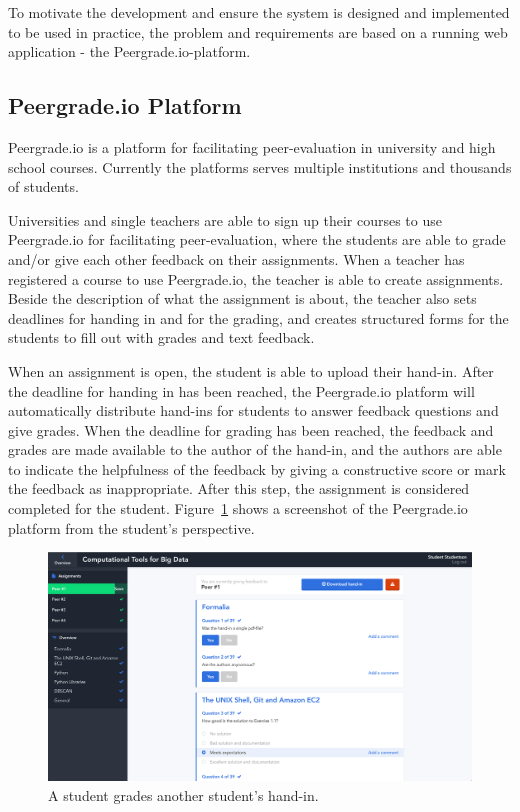 To motivate the development and ensure the system is designed and implemented to be used in practice, the problem and requirements are based on a running web application - the Peergrade.io-platform.

\subsection{Peergrade.io Platform}
\label{subsec:the-peergrade-io-platform}

Peergrade.io is a platform for facilitating peer-evaluation in university and high school courses. Currently the platforms serves multiple institutions and thousands of students.

Universities and single teachers are able to sign up their courses to use Peergrade.io for facilitating peer-evaluation, where the students are able to grade and/or give each other feedback on their assignments. When a teacher has registered a course to use Peergrade.io, the teacher is able to create assignments. Beside the description of what the assignment is about, the teacher also sets deadlines for handing in and for the grading, and creates structured forms for the students to fill out with grades and text feedback.

When an assignment is open, the student is able to upload their hand-in. After the deadline for handing in has been reached, the Peergrade.io platform will automatically distribute hand-ins for students to answer feedback questions and give grades. When the deadline for grading has been reached, the feedback and grades are made available to the author of the hand-in, and the authors are able to indicate the helpfulness of the feedback by giving a constructive score or mark the feedback as inappropriate. After this step, the assignment is considered completed for the student. Figure~\ref{fig:student-screenshot} shows a screenshot of the Peergrade.io platform from the student's perspective.

\begin{figure}[ht!]
  \includegraphics[width=\textwidth]{figures/screenshots/student_give_feedback.png}
  \caption[Screenshot from Peergrade.io]{A student grades another student's hand-in.}
  \label{fig:student-screenshot}
\end{figure}

